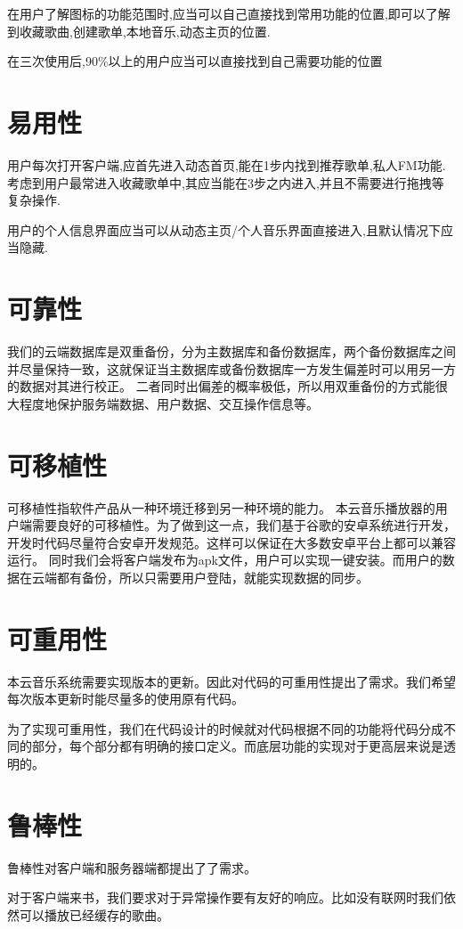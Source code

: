 在用户了解图标的功能范围时,应当可以自己直接找到常用功能的位置,即可以了解到收藏歌曲,创建歌单,本地音乐,动态主页的位置.

在三次使用后,90\%以上的用户应当可以直接找到自己需要功能的位置

\section{易用性}
用户每次打开客户端,应首先进入动态首页,能在1步内找到推荐歌单,私人FM功能.考虑到用户最常进入收藏歌单中,其应当能在3步之内进入,并且不需要进行拖拽等复杂操作.

用户的个人信息界面应当可以从动态主页/个人音乐界面直接进入,且默认情况下应当隐藏.

\section{可靠性}
我们的云端数据库是双重备份，分为主数据库和备份数据库，两个备份数据库之间并尽量保持一致，这就保证当主数据库或备份数据库一方发生偏差时可以用另一方的数据对其进行校正。
二者同时出偏差的概率极低，所以用双重备份的方式能很大程度地保护服务端数据、用户数据、交互操作信息等。


\section{可移植性}
可移植性指软件产品从一种环境迁移到另一种环境的能力。
本云音乐播放器的用户端需要良好的可移植性。为了做到这一点，我们基于谷歌的安卓系统进行开发，开发时代码尽量符合安卓开发规范。这样可以保证在大多数安卓平台上都可以兼容运行。
同时我们会将客户端发布为apk文件，用户可以实现一键安装。而用户的数据在云端都有备份，所以只需要用户登陆，就能实现数据的同步。


\section{可重用性}
本云音乐系统需要实现版本的更新。因此对代码的可重用性提出了需求。我们希望每次版本更新时能尽量多的使用原有代码。

为了实现可重用性，我们在代码设计的时候就对代码根据不同的功能将代码分成不同的部分，每个部分都有明确的接口定义。而底层功能的实现对于更高层来说是透明的。

\section{鲁棒性}
鲁棒性对客户端和服务器端都提出了了需求。

对于客户端来书，我们要求对于异常操作要有友好的响应。比如没有联网时我们依然可以播放已经缓存的歌曲。

